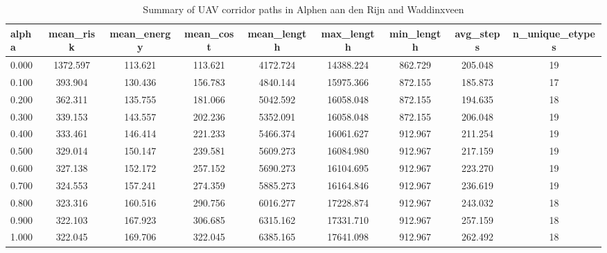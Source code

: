 \begin{table}
\caption{Summary of UAV corridor paths in Alphen aan den Rijn and Waddinxveen}
\label{tab:alphen_waddinxveen_summary}
\begin{tabular}{lcccccccc}
\toprule
alpha & mean_risk & mean_energy & mean_cost & mean_length & max_length & min_length & avg_steps & n_unique_etypes \\
\midrule
0.000 & 1372.597 & 113.621 & 113.621 & 4172.724 & 14388.224 & 862.729 & 205.048 & 19 \\
0.100 & 393.904 & 130.436 & 156.783 & 4840.144 & 15975.366 & 872.155 & 185.873 & 17 \\
0.200 & 362.311 & 135.755 & 181.066 & 5042.592 & 16058.048 & 872.155 & 194.635 & 18 \\
0.300 & 339.153 & 143.557 & 202.236 & 5352.091 & 16058.048 & 872.155 & 206.048 & 19 \\
0.400 & 333.461 & 146.414 & 221.233 & 5466.374 & 16061.627 & 912.967 & 211.254 & 19 \\
0.500 & 329.014 & 150.147 & 239.581 & 5609.273 & 16084.980 & 912.967 & 217.159 & 19 \\
0.600 & 327.138 & 152.172 & 257.152 & 5690.273 & 16104.695 & 912.967 & 223.270 & 19 \\
0.700 & 324.553 & 157.241 & 274.359 & 5885.273 & 16164.846 & 912.967 & 236.619 & 19 \\
0.800 & 323.316 & 160.516 & 290.756 & 6016.277 & 17228.874 & 912.967 & 243.032 & 18 \\
0.900 & 322.103 & 167.923 & 306.685 & 6315.162 & 17331.710 & 912.967 & 257.159 & 18 \\
1.000 & 322.045 & 169.706 & 322.045 & 6385.165 & 17641.098 & 912.967 & 262.492 & 18 \\
\bottomrule
\end{tabular}
\end{table}
